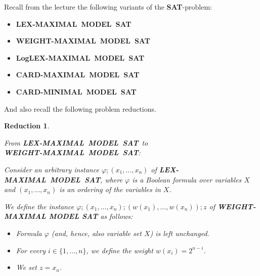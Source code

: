 \documentclass [11pt]{article}
\newtheorem{reduction}{Reduction}
\renewcommand{\phi}{\varphi}
\newcommand{\SAT}{\mbox{\bf SAT}}
\newcommand{\MINCARDSAT}{\mbox{\bf CARD-MINIMAL MODEL SAT}}
\newcommand{\MAXCARDSAT}{\mbox{\bf CARD-MAXIMAL MODEL SAT}}
\newcommand{\MAXWEIGHTSAT}{\mbox{\bf WEIGHT-MAXIMAL MODEL SAT}}
\newcommand{\MAXLEXSAT}{\mbox{\bf LEX-MAXIMAL MODEL SAT}}
\newcommand{\LogMAXLEXSAT}{\mbox{\bf LogLEX-MAXIMAL MODEL SAT}}
\begin{document}
\noindent
Recall from the lecture the following variants of the \SAT -problem:
\begin{itemize}
\item \MAXLEXSAT
\item \MAXWEIGHTSAT
\item \LogMAXLEXSAT
\item \MAXCARDSAT
\item \MINCARDSAT
\end{itemize}

\noindent
And also recall the following problem reductions. 

\begin{reduction}
\label{red:1}
{\em 
From \MAXLEXSAT\ to 
\\
\MAXWEIGHTSAT: 

\smallskip

\noindent
Consider an arbitrary instance 
$\phi; (x_1, \dots, x_n)$ of 
\MAXLEXSAT, \linebreak
where
$\phi$ is a Boolean formula over variables $X$ and 
$(x_1, \dots, x_n)$  is an ordering  
of the variables in $X$. 

\smallskip

\noindent
We define the instance 
$\phi; (x_1, \dots, x_n); (w(x_1), \dots, w(x_n)); z$ of 
{\bf WEIGHT-MAXIMAL MODEL SAT} as follows:

\begin{itemize}
\item Formula $\phi$ (and, hence, also variable set $X$) is left unchanged.
\item For every $i \in \{1, \dots, n\}$, we define
the weight $w(x_i) = 2^{n-i}$. 
\item We set $z = x_n$.
\end{itemize}

}
\end{reduction}

\end{document}
